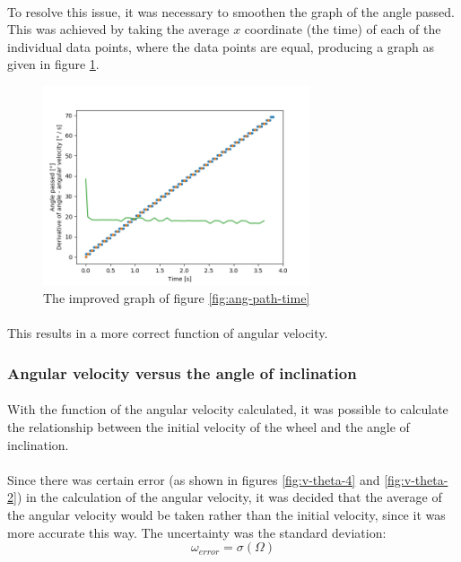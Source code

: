 \documentclass[a4paper]{article}
\begin{document}
\paragraph*{}
To resolve this issue, it was necessary to smoothen the graph of the angle
passed. This was achieved by taking the average $x$ coordinate (the time) of
each of the individual data points, where the data points are equal, producing
a graph as given in figure \ref{fig:ang-path-time-fixed}.

\begin{figure}[ht]
  \centering
  \includegraphics[width=0.7\textwidth]{img/ang-path-time-fixed}
  \caption{The improved graph of figure \ref{fig:ang-path-time}}
  \label{fig:ang-path-time-fixed}
\end{figure}

\paragraph*{}
This results in a more correct function of angular velocity.

\subsubsection{Angular velocity versus the angle of inclination}

\paragraph*{}
With the function of the angular velocity calculated, it was possible to
calculate the relationship between the initial velocity of the wheel and the
angle of inclination.

\paragraph*{}
Since there was certain error (as shown in figures \ref{fig:v-theta-4} and
\ref{fig:v-theta-2}) in the calculation of the angular velocity, it was decided
that the average of the angular velocity would be taken rather than the initial
velocity, since it was more accurate this way. The uncertainty was the standard
deviation:
$$\omega_{error} = \sigma(\Omega)$$
\end{document}
